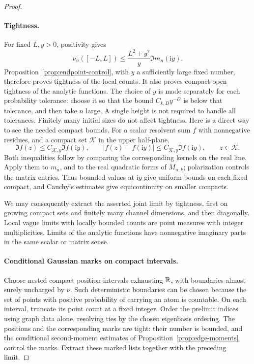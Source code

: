 \begin{proof}
\leavevmode
\paragraph{Tightness.}
For fixed \(L,y>0\), positivity gives
\[
 \nu_n([-L,L])\le \frac{L^2+y^2}{y}\Im m_n(\mathrm i y).
\]
Proposition~\ref{prop:endpoint-control}, with \(y\) a sufficiently
large fixed number, therefore proves tightness of the local counts.
It also proves compact-open tightness of the analytic functions.
The choice of \(y\) is made separately for each probability tolerance:
choose it so that the bound \(C_{k,D}y^{-D}\) is below that tolerance,
and then take \(n\) large. A single height is not required to handle
all tolerances. Finitely many initial sizes do not affect tightness.
Here is a direct way to see the needed compact bounds. For a scalar
resolvent sum \(f\) with nonnegative residues, and a compact set
\(\mathcal K\) in the upper half-plane,
\[
 \Im f(z)\le C_{\mathcal K,y}\Im f(\mathrm i y),
 \qquad
 |f(z)-f(\mathrm i y)|
 \le C_{\mathcal K,y}\Im f(\mathrm i y),
 \qquad z\in\mathcal K.
\]
Both inequalities follow by comparing the corresponding kernels on
the real line. Apply them to \(m_n\), and to the real quadratic forms
of \(M_{n,k}\); polarization controls the matrix entries. Thus bounded
values at \(\mathrm i y\) give uniform bounds on each fixed compact,
and Cauchy's estimates give equicontinuity on smaller compacts.

We may consequently extract the asserted joint limit by tightness,
first on growing compact sets and finitely many channel dimensions,
and then diagonally. Local vague limits with locally bounded counts
are point measures with integer multiplicities. Limits of the
analytic functions have nonnegative imaginary parts in the same
scalar or matrix sense.

\paragraph{Conditional Gaussian marks on compact intervals.}
Choose nested compact position intervals exhausting \(\mathbb R\), with
boundaries almost surely uncharged by \(\nu\). Such deterministic
boundaries can be chosen because the set of points with positive
probability of carrying an atom is countable. On each interval,
truncate its point count at a fixed integer. Order the prelimit
indices using graph data alone, resolving ties by the chosen
eigenbasis ordering. The positions and the corresponding marks are
tight: their number is bounded, and the conditional second-moment
estimates of Proposition~\ref{prop:edge-moments} control the marks.
Extract these marked lists together with the preceding limit.


\end{proof}
